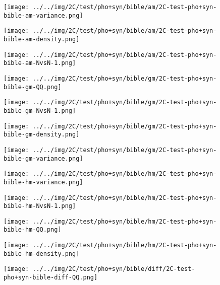 \begin{figure}[H]
\centering	\texttt{[image: ../../img/2C/test/pho+syn/bible/am/2C-test-pho+syn-bible-am-variance.png]}
\end{figure}
\begin{figure}[H]
\centering	\texttt{[image: ../../img/2C/test/pho+syn/bible/am/2C-test-pho+syn-bible-am-density.png]}
\end{figure}
\begin{figure}[H]
\centering	\texttt{[image: ../../img/2C/test/pho+syn/bible/am/2C-test-pho+syn-bible-am-NvsN-1.png]}
\end{figure}
\begin{figure}[H]
\centering	\texttt{[image: ../../img/2C/test/pho+syn/bible/gm/2C-test-pho+syn-bible-gm-QQ.png]}
\end{figure}
\begin{figure}[H]
\centering	\texttt{[image: ../../img/2C/test/pho+syn/bible/gm/2C-test-pho+syn-bible-gm-NvsN-1.png]}
\end{figure}
\begin{figure}[H]
\centering	\texttt{[image: ../../img/2C/test/pho+syn/bible/gm/2C-test-pho+syn-bible-gm-density.png]}
\end{figure}
\begin{figure}[H]
\centering	\texttt{[image: ../../img/2C/test/pho+syn/bible/gm/2C-test-pho+syn-bible-gm-variance.png]}
\end{figure}
\begin{figure}[H]
\centering	\texttt{[image: ../../img/2C/test/pho+syn/bible/hm/2C-test-pho+syn-bible-hm-variance.png]}
\end{figure}
\begin{figure}[H]
\centering	\texttt{[image: ../../img/2C/test/pho+syn/bible/hm/2C-test-pho+syn-bible-hm-NvsN-1.png]}
\end{figure}
\begin{figure}[H]
\centering	\texttt{[image: ../../img/2C/test/pho+syn/bible/hm/2C-test-pho+syn-bible-hm-QQ.png]}
\end{figure}
\begin{figure}[H]
\centering	\texttt{[image: ../../img/2C/test/pho+syn/bible/hm/2C-test-pho+syn-bible-hm-density.png]}
\end{figure}
\begin{figure}[H]
\centering	\texttt{[image: ../../img/2C/test/pho+syn/bible/diff/2C-test-pho+syn-bible-diff-QQ.png]}
\end{figure}
